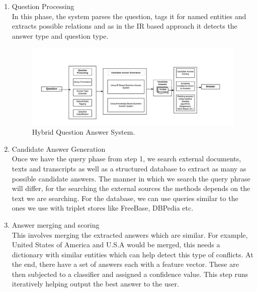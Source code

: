\begin{enumerate}

\item Question Processing \\
In this phase, the system parses the question, tags it for named entities and extracts possible relations and as in the IR based approach it detects the answer type and question type.

\begin{figure}[htb]
\centering
\includegraphics[scale=0.8]{images/Hybrid_QA.jpg}
\caption{Hybrid Question Answer System.} 
\label{fig:Hybrid_QA}
\end{figure}

\break
\item Candidate Answer Generation \\
Once we have the query phase from step 1, we search external documents, texts and transcripts as well as a structured database to extract as many as possible candidate answers. The manner in which we search the query phrase will differ, for the searching the external sources the methods depends on the text we are searching. For the database, we can use queries similar to the ones we use with triplet stores like FreeBase, DBPedia etc.

\item Answer merging and scoring \\
This involves merging the extracted answers which are similar. For example, United States of America and U.S.A would be merged, this needs a dictionary with similar entities which can help detect this type of conflicts. At the end, there have a set of answers each with a feature vector. These are then subjected to a classifier and assigned a confidence value. This step runs iteratively helping output the best answer to the user.

 \end{enumerate}